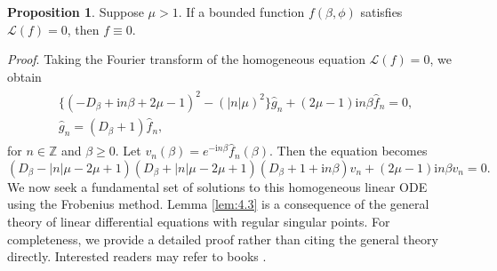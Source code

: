 \documentclass[11pt]{article}
\theoremstyle{definition}
\newtheorem{prop}[theorem]{Proposition}
\theoremstyle{remark}
\numberwithin{equation}{section}
\newcommand{\mbb}{\mathbb}
\newcommand{\mcal}{\mathcal}
\renewcommand{\hat}{\widehat}
\newcommand{\Z}{\mbb{Z}}
\begin{document}
\begin{prop} \label{prop:4.2}
 Suppose $\mu > 1$. If a bounded function $f(\beta,\phi)$ satisfies $\mcal{L}(f) = 0$, then $f \equiv 0$.
\end{prop}
\noindent\textit{Proof}. Taking the Fourier transform of the homogeneous equation $\mcal{L}(f) = 0$, we obtain
\begin{align*} \begin{split}
    & \big\{(-D_\beta + \textrm{i}n \beta + 2\mu - 1)^2 - (|n|\mu)^2 \big\} \hat{g}_n + (2\mu - 1) \textrm{i}n \beta \hat{f}_n = 0, \\
    & \hat{g}_n = (D_\beta + 1) \hat{f}_n,
\end{split} \end{align*}
for $n\in\Z$ and $\beta \geq 0$. Let $v_n (\beta) = e^{-\textrm{i}n \beta} \hat{f}_n(\beta)$. Then the equation becomes
\begin{equation} \label{eq:4.2}
(D_\beta - |n|\mu - 2\mu + 1)(D_\beta + |n|\mu - 2\mu + 1)(D_\beta + 1 + \textrm{i}n\beta) v_n + (2\mu - 1) \textrm{i}n\beta v_n = 0.
\end{equation}
We now seek a fundamental set of solutions to this homogeneous linear ODE using the Frobenius method. Lemma \ref{lem:4.3} is a consequence of the general theory of linear differential equations with regular singular points. For completeness, we provide a detailed proof rather than citing the general theory directly. Interested readers may refer to books \cite{CL55, Was87}. %
\end{document}
